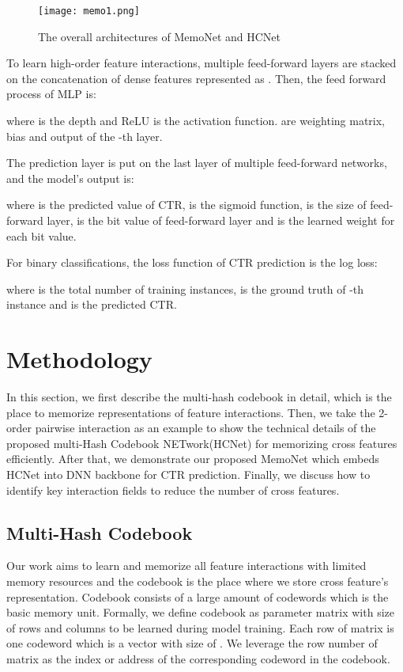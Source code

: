 \documentclass[sigconf,authorversion]{acmart}
\begin{document}
\begin{figure*}[h]
  \centering
  \texttt{[image: memo1.png]}
  \caption{The overall architectures of MemoNet and HCNet}
  \Description{}
\end{figure*}


To learn high-order feature interactions, multiple feed-forward layers are stacked on the concatenation of dense features represented as . Then, the feed forward process of MLP is:

where  is the depth and ReLU is the activation function.  are weighting matrix, bias and output of the -th layer. 

The prediction layer is put on the last layer of multiple feed-forward networks, and the model’s output is:

where  is the predicted value of CTR,  is the sigmoid function,  is the size of feed-forward layer,  is the bit value of feed-forward layer and  is the learned weight for each bit value.

For binary classifications, the loss function of CTR prediction is the log loss:

where  is the total number of training instances,  is the ground truth of -th instance and  is the predicted CTR.  

\section{Methodology}
In this section, we first describe the multi-hash codebook in detail, which is the place to memorize representations of feature interactions. Then, we take the 2-order pairwise interaction as an example to show the technical details of
the proposed multi-Hash Codebook NETwork(HCNet) for memorizing  cross features efficiently. After that, we demonstrate our proposed MemoNet which embeds HCNet into DNN backbone for CTR prediction. Finally, we discuss how to identify key interaction fields to reduce the number of cross features.


\subsection{Multi-Hash Codebook}
Our work aims to learn and memorize all feature interactions with limited memory resources and the codebook is the place where we store cross feature's representation. Codebook consists of a large amount of codewords  which  is the basic memory unit. Formally, we define codebook as parameter matrix  with size of  rows and  columns to be learned during model training. Each row of matrix  is one codeword which is a vector with size of . We leverage the row number of matrix  as the index or address of the corresponding codeword in the codebook.
\end{document}
